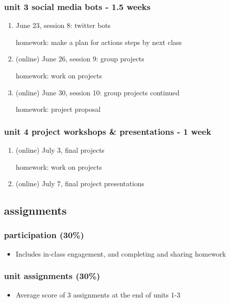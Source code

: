 \documentclass[11pt]{article}
\begin{document}
\subsubsection{unit 3 social media bots - 1.5 weeks}
\label{sec:org1f8ac74}
\begin{enumerate}
\item June 23, session 8: twitter bots
\label{sec:org15265f2}

homework: make a plan for actions steps by next class

\item (online) June 26, session 9: group projects
\label{sec:orge954c33}

homework: work on projects

\item (online) June 30, session 10: group projects continued
\label{sec:org4c91f5e}

homework: project proposal
\end{enumerate}

\subsubsection{unit 4 project workshops \& presentations - 1 week}
\label{sec:orgff9d547}
\begin{enumerate}
\item (online) July 3, final projects
\label{sec:org3b71eba}

homework: work on projects

\item (online) July 7, final project presentations
\label{sec:org644bc4e}
\end{enumerate}

\subsection{assignments}
\label{sec:orgdf94890}
\subsubsection{participation (30\%)}
\label{sec:org599c846}
\begin{itemize}
\item Includes in-class engagement, and completing and sharing homework
\end{itemize}
\subsubsection{unit assignments (30\%)}
\label{sec:org7d6ca43}
\begin{itemize}
\item Average score of 3 assignments at the end of units 1-3
\end{itemize}
\end{document}
